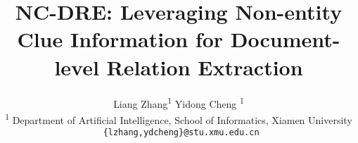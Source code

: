 \documentclass[sigconf,natbib=true]{acmart}
\begin{document}
\title{NC-DRE: Leveraging Non-entity Clue Information for Document-level Relation Extraction}

\author {
    Liang Zhang\textsuperscript{\rm 1} 
    Yidong Cheng \textsuperscript{\rm 1}\\
    \textsuperscript{\rm 1} Department of Artificial Intelligence, School of Informatics, Xiamen University\\
    \texttt{ \{lzhang,ydcheng\}@stu.xmu.edu.cn} \\
}







\end{document}
